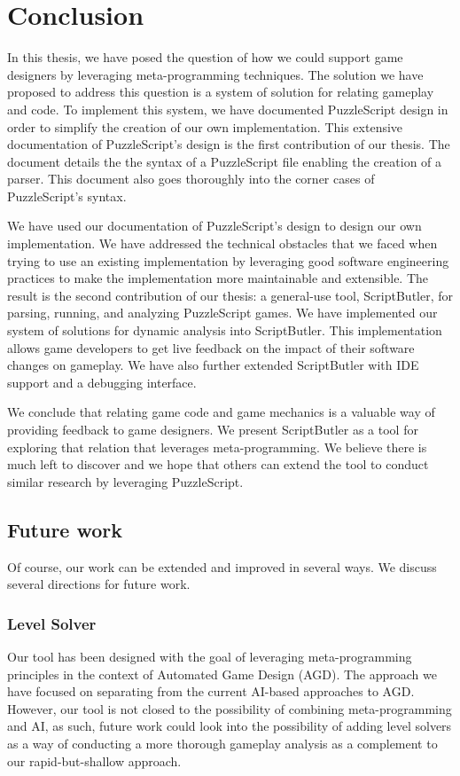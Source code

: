 \chapter{Conclusion}
\label{ch:conclusion}

In this thesis, we have posed the question of how we could support game designers by leveraging meta-programming techniques. The solution we have proposed to address this question is a system of solution for relating gameplay and code. To implement this system, we have documented PuzzleScript design in order to simplify the creation of our own implementation. This extensive documentation of PuzzleScript's design is the first contribution of our thesis. The document details the the syntax of a PuzzleScript file enabling the creation of a parser. This document also goes thoroughly into the corner cases of PuzzleScript's syntax.

We have used our documentation of PuzzleScript's design to design our own implementation. We have addressed the technical obstacles that we faced when trying to use an existing implementation by leveraging good software engineering practices to make the implementation more maintainable and extensible. The result is the second contribution of our thesis: a general-use tool, ScriptButler, for parsing, running, and analyzing PuzzleScript games.  We have implemented our system of solutions for dynamic analysis into ScriptButler. This implementation allows game developers to get live feedback on the impact of their software changes on gameplay. We have also further extended ScriptButler with IDE support and a debugging interface.

We conclude that relating game code and game mechanics is a valuable way of providing feedback to game designers. We present ScriptButler as a tool for exploring that relation that leverages meta-programming. We believe there is much left to discover and we hope that others can extend the tool to conduct similar research by leveraging PuzzleScript.

\section{Future work}
\label{sec:future_work}
Of course, our work can be extended and improved in several ways. We discuss several directions for future work.

\subsection{Level Solver}
Our tool has been designed with the goal of leveraging meta-programming principles in the context of Automated Game Design (AGD). The approach we have focused on separating from the current AI-based approaches to AGD. However, our tool is not closed to the possibility of combining meta-programming and AI, as such, future work could look into the possibility of adding level solvers as a way of conducting a more thorough gameplay analysis as a complement to our rapid-but-shallow approach.

